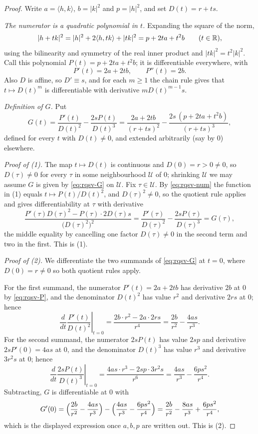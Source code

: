 \begin{proof}
Write $a=\langle h,k\rangle$, $b=|k|^2$ and $p=|h|^2$, and set
$D(t)=r+ts$.

\emph{The numerator is a quadratic polynomial in $t$.} Expanding the square of
the norm,
\begin{equation}\label{eq:rqsv-num}
  |h+tk|^2=|h|^2+2\langle h,tk\rangle+|tk|^2=p+2ta+t^2b
  \qquad(t\in\mathbb{R}),
\end{equation}
using the bilinearity and symmetry of the real inner product and
$|tk|^2=t^2|k|^2$. Call this polynomial $P(t)=p+2ta+t^2b$; it is differentiable
everywhere, with
\begin{equation}\label{eq:rqsv-P}
  P'(t)=2a+2tb,\qquad P''(t)=2b .
\end{equation}
Also $D$ is affine, so $D'\equiv s$, and for each $m\ge1$ the chain rule gives
that $t\mapsto D(t)^m$ is differentiable with derivative $mD(t)^{m-1}s$.

\emph{Definition of $G$.} Put
\begin{equation}\label{eq:rqsv-G}
  G(t)=\frac{P'(t)}{D(t)^2}-\frac{2sP(t)}{D(t)^3}
   =\frac{2a+2tb}{(r+ts)^2}-\frac{2s\,(p+2ta+t^2b)}{(r+ts)^3},
\end{equation}
defined for every $t$ with $D(t)\ne0$, and extended arbitrarily (say by $0$)
elsewhere.

\emph{Proof of (1).} The map $t\mapsto D(t)$ is continuous and
$D(0)=r>0\ne0$, so $D(\tau)\ne0$ for every $\tau$ in some neighbourhood
$\mathcal U$ of $0$; shrinking $\mathcal U$ we may assume $G$ is given by
\eqref{eq:rqsv-G} on $\mathcal U$. Fix $\tau\in\mathcal U$. By
\eqref{eq:rqsv-num} the function in (1) equals $t\mapsto P(t)/D(t)^2$, and
$D(\tau)^2\ne0$, so the quotient rule applies and gives differentiability at
$\tau$ with derivative
\[
  \frac{P'(\tau)D(\tau)^2-P(\tau)\cdot 2D(\tau)s}{\bigl(D(\tau)^2\bigr)^2}
   =\frac{P'(\tau)}{D(\tau)^2}-\frac{2sP(\tau)}{D(\tau)^3}
   =G(\tau),
\]
the middle equality by cancelling one factor $D(\tau)\neq 0$ in the second term
and two in the first. This is (1).

\emph{Proof of (2).} We differentiate the two summands of \eqref{eq:rqsv-G} at
$t=0$, where $D(0)=r\ne0$ so both quotient rules apply.

For the first summand, the numerator $P'(t)=2a+2tb$ has derivative $2b$ at $0$
by \eqref{eq:rqsv-P}, and the denominator $D(t)^2$ has value $r^2$ and
derivative $2rs$ at $0$; hence
\[
  \left.\frac{d}{dt}\frac{P'(t)}{D(t)^2}\right|_{t=0}
   =\frac{2b\cdot r^2-2a\cdot 2rs}{r^4}
   =\frac{2b}{r^2}-\frac{4as}{r^3}.
\]
For the second summand, the numerator $2sP(t)$ has value $2sp$ and derivative
$2sP'(0)=4as$ at $0$, and the denominator $D(t)^3$ has value $r^3$ and
derivative $3r^2s$ at $0$; hence
\[
  \left.\frac{d}{dt}\frac{2sP(t)}{D(t)^3}\right|_{t=0}
   =\frac{4as\cdot r^3-2sp\cdot3r^2s}{r^6}
   =\frac{4as}{r^3}-\frac{6ps^2}{r^4}.
\]
Subtracting, $G$ is differentiable at $0$ with
\[
  G'(0)=\Bigl(\frac{2b}{r^2}-\frac{4as}{r^3}\Bigr)
        -\Bigl(\frac{4as}{r^3}-\frac{6ps^2}{r^4}\Bigr)
   =\frac{2b}{r^2}-\frac{8as}{r^3}+\frac{6ps^2}{r^4},
\]
which is the displayed expression once $a,b,p$ are written out. This is (2).
\end{proof}
